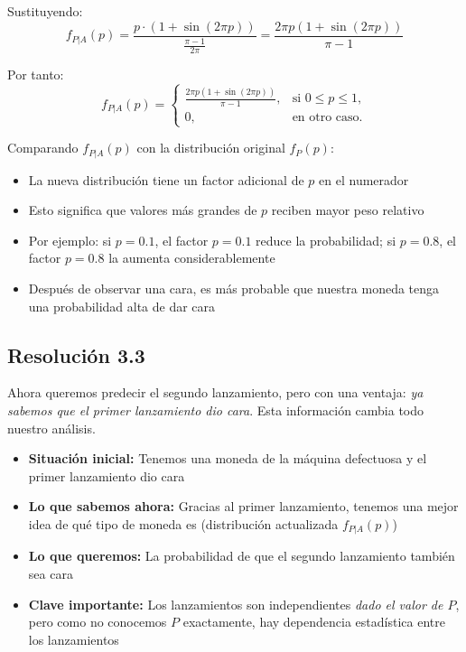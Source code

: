 \documentclass[
  11pt,
  letterpaper,
   addpoints,
  answers
  ]{exam}
\begin{document}
\begin{questions}
\begin{solution}
Sustituyendo:
\begin{equation}
f_{P|A}(p) = \frac{p \cdot (1 + \sin(2\pi p))}{\frac{\pi - 1}{2\pi}} = \frac{2\pi p(1 + \sin(2\pi p))}{\pi - 1}
\end{equation}

Por tanto:
\begin{equation}
f_{P|A}(p) = \begin{cases}
\frac{2\pi p(1 + \sin(2\pi p))}{\pi - 1}, & \text{si } 0 \leq p \leq 1, \\
0, & \text{en otro caso}.
\end{cases}
\end{equation}

Comparando $f_{P|A}(p)$ con la distribución original $f_P(p)$:
\begin{itemize}
\item La nueva distribución tiene un factor adicional de $p$ en el numerador
\item Esto significa que valores más grandes de $p$ reciben mayor peso relativo
\item Por ejemplo: si $p = 0.1$, el factor $p = 0.1$ reduce la probabilidad; si $p = 0.8$, el factor $p = 0.8$ la aumenta considerablemente
\item Después de observar una cara, es más probable que nuestra moneda tenga una probabilidad alta de dar cara
\end{itemize}

\subsection*{Resolución 3.3}

Ahora queremos predecir el segundo lanzamiento, pero con una ventaja: \emph{ya sabemos que el primer lanzamiento dio cara}. Esta información cambia todo nuestro análisis.


\begin{itemize}
\item \textbf{Situación inicial:} Tenemos una moneda de la máquina defectuosa y el primer lanzamiento dio cara
\item \textbf{Lo que sabemos ahora:} Gracias al primer lanzamiento, tenemos una mejor idea de qué tipo de moneda es (distribución actualizada $f_{P|A}(p)$)
\item \textbf{Lo que queremos:} La probabilidad de que el segundo lanzamiento también sea cara
\item \textbf{Clave importante:} Los lanzamientos son independientes \emph{dado el valor de $P$}, pero como no conocemos $P$ exactamente, hay dependencia estadística entre los lanzamientos
\end{itemize}


\end{solution}
\end{questions}
\end{document}

